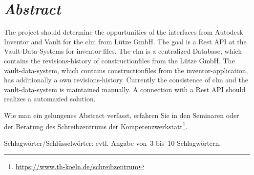 \chapter*{\emph{Abstract}}
\label{chap:abstract}
%
The project should determine the oppurtunities of the interfaces from Autodesk Inventor and Vault for the \gls{clm} from Lütze GmbH. The goal is a Rest API at the Vault-Data-Systems for inventor-files. The \gls{clm} is a centralized Database, which contains the revisions-history of constructionfiles from the Lütze GmbH. The vault-data-system, which contains constructionfiles from the inventor-application, has additionally a own revisions-history. Currently the consistence of \gls{clm} and the vault-data-system is maintained manually. A connection with a Rest API should realizes a automazied solution.      
\par
Wie man ein gelungenes Abstract verfasst, erfahren Sie in den Seminaren oder der Beratung des Schreibzentrums der Kompetenzwerkstatt\footnote{\href{https://www.th-koeln.de/schreibzentrum}{https://www.th-koeln.de/schreibzentrum}}.
\par
Schlagwörter/Schlüsselwörter: evtl. Angabe von~3 bis~10 Schlagwörtern.